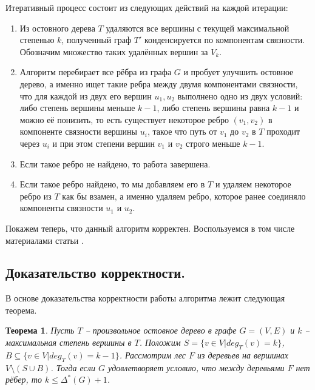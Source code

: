 \documentclass[a4paper,11pt]{article}
\renewcommand{\le}{\ensuremath{\leqslant}}
\theoremstyle{plain}
\newtheorem{theorem}{Теорема}[section]
\theoremstyle{definition}
\theoremstyle{remark}
\begin{document}
Итеративный процесс состоит из следующих действий на каждой итерации:

\begin{enumerate}
  \item Из остовного дерева $T$ удаляются все вершины с текущей максимальной степенью $k$, полученный граф $T'$ конденсируется по компонентам связности. Обозначим множество таких удалённых вершин за $V_k$.
  \item Алгоритм перебирает все рёбра из графа $G$ и пробует улучшить остовное дерево, а именно ищет такие ребра между двумя компонентами связности, что для каждой из двух его вершин $u_1, u_2$ выполнено одно из двух условий: либо степень вершины меньше $k-1$, либо степень вершины равна $k-1$ и можно её понизить, то есть существует некоторое ребро $(v_1, v_2)$ в компоненте связности вершины $u_i$, такое что путь от $v_1$ до $v_2$ в $T$ проходит через $u_i$ и при этом степени вершин $v_1$ и $v_2$ строго меньше $k-1$.
  \item Если такое ребро не найдено, то работа завершена.
  \item Если такое ребро найдено, то мы добавляем его в $T$ и удаляем некоторое ребро из $T$ как бы взамен, а именно удаляем ребро, которое ранее соединяло компоненты связности $u_1$ и $u_2$.
\end{enumerate}

Покажем теперь, что данный алгоритм корректен. Воспользуемся в том числе материалами статьи \cite{ref2}.

\subsection{Доказательство корректности.}

В основе доказательства корректности работы алгоритма лежит следующая теорема.

\begin{theorem}
  Пусть $T$ -- произвольное остовное дерево в графе $G = (V, E)$ и $k$ -- максимальная степень вершины в $T$. Положим $S = \{v\in V | deg_T(v) = k\}$, $B \subseteq \{v \in V | deg_T(v) = k-1\}$. Рассмотрим лес $F$ из деревьев на вершинах $V \setminus (S \cup B)$. Тогда если $G$ удовлетворяет условию, что между деревьями $F$ нет рёбер, то $k \le \Delta^*(G) + 1$.
\end{theorem}
\end{document}
